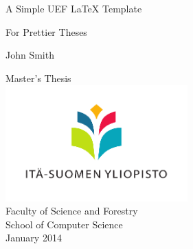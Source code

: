 \def \ajankohta {Tammikuu 2014 }
\def \ajankohtaenglish {January 2014 }
\def \authorname {John Smith }
\def \thesistitle {A Simple UEF LaTeX Template }
\def \thesissubtext { For Prettier Theses }
\def \campus {Joensuu }
\def \facultyschooleng {School of Computer Science }
\def \facultyschoolfin {Tietojenkäsittelytiede }
\def \supervisorsfin {FT Jane Doe }
\def \supervisorseng {PhD Jane Doe }

\def \documenttypeeng {Master's Thesis }
\def \documenttypefin {Pro gradu -tutkielman }

\def \mypagecount {42 }
\def \myappendixcount {1 }
\def \myappendixpagecount {32 }


\vspace*{3cm}
\vspace{0.5cm}

\begin{center}
\begin{LARGE}\thesistitle \end{LARGE}

\begin{Large}\thesissubtext \end{Large} 

\vspace{1.5cm}

\begin{Large}\authorname \end{Large}


{\large
\documenttypeeng
~\\
\includegraphics[width=7cm]{UEF_fin_pysty_1_cmyk}\\
Faculty of Science and Forestry\\
\facultyschooleng \\
\ajankohtaenglish \\
}
\end{center}

